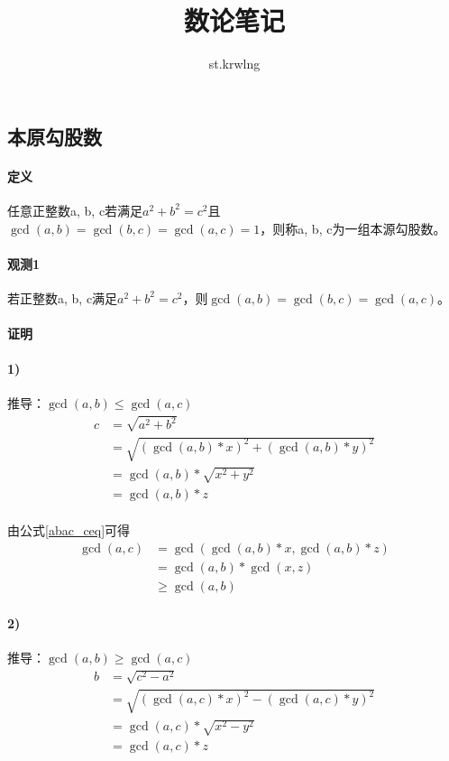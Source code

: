 \documentclass[UTF8]{ctexart}
\title{数论笔记}
\author{st.krwlng}
\begin{document}
	\maketitle
	\subsection{本原勾股数}
	\paragraph{定义} 任意正整数a, b, c若满足$a^2+b^2=c^2$且$\gcd(a,b)=\gcd(b,c)=\gcd(a,c)=1$，则称a, b, c为一组本源勾股数。
	\paragraph{观测1} 若正整数a, b, c满足$a^2+b^2=c^2$，则$\gcd(a,b)=\gcd(b,c)=\gcd(a,c)$。
	\paragraph{证明}
	\paragraph{1)}推导：$\gcd(a,b){\leq}\gcd(a,c)$ 
	\begin{equation}\label{abac_ceq}
		\begin{aligned}
			c&=\sqrt{a^2+b^2}\\
			 &=\sqrt{(\gcd(a,b)*x)^2+(\gcd(a,b)*y)^2}\\
			 &=\gcd(a,b)*\sqrt{x^2+y^2}\\
			 &=\gcd(a,b)*z
		\end{aligned}
	\end{equation}
	\paragraph{}由公式\ref{abac_ceq}可得
	\begin{equation}\label{abac_gcd_ac}
		\begin{aligned}
			\gcd(a,c)&=\gcd(\gcd(a,b)*x,\gcd(a,b)*z)\\
					&=\gcd(a,b)*\gcd(x,z)\\
					&{\geq}\gcd(a,b)
		\end{aligned}
	\end{equation}

	\paragraph{2)}推导：$\gcd(a,b){\geq}\gcd(a,c)$
	\begin{equation}\label{acab_beq}
		\begin{aligned}
			b&=\sqrt{c^2-a^2}\\
			 &=\sqrt{(\gcd(a,c)*x)^2-(\gcd(a,c)*y)^2}\\
			 &=\gcd(a,c)*\sqrt{x^2-y^2}\\
			 &=\gcd(a,c)*z
		\end{aligned}
	\end{equation}
\end{document}

